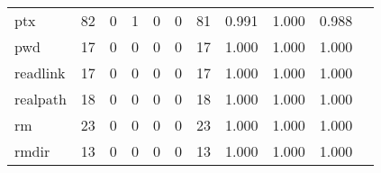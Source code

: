 \begin{longtable}{lp{1.2cm}p{1.2cm}p{1.2cm}p{1.2cm}p{1.2cm}p{1.2cm}p{1.2cm}p{1.2cm}p{1.2cm}p{1.2cm}}
ptx       &                                    82 &                                                  0 &                                                  1 &                                                  0 &                                                  0 &                                                 81 &                                         0.991 &                                              1.000 &                                              0.988 \\
pwd       &                                    17 &                                                  0 &                                                  0 &                                                  0 &                                                  0 &                                                 17 &                                         1.000 &                                              1.000 &                                              1.000 \\
readlink  &                                    17 &                                                  0 &                                                  0 &                                                  0 &                                                  0 &                                                 17 &                                         1.000 &                                              1.000 &                                              1.000 \\
realpath  &                                    18 &                                                  0 &                                                  0 &                                                  0 &                                                  0 &                                                 18 &                                         1.000 &                                              1.000 &                                              1.000 \\
rm        &                                    23 &                                                  0 &                                                  0 &                                                  0 &                                                  0 &                                                 23 &                                         1.000 &                                              1.000 &                                              1.000 \\
rmdir     &                                    13 &                                                  0 &                                                  0 &                                                  0 &                                                  0 &                                                 13 &                                         1.000 &                                              1.000 &                                              1.000 \\

\end{longtable}
